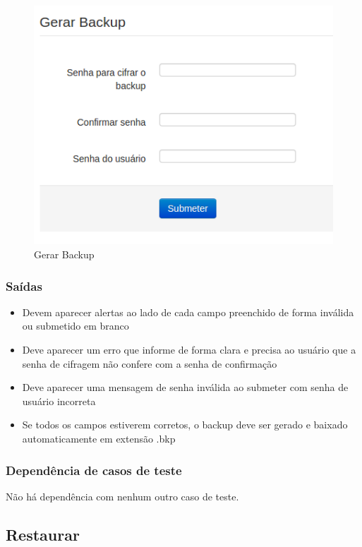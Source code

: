 \begin{figure}[ht]
     \centering
     \includegraphics[scale=0.6]{images/gerarbackup.png}
     \caption{Gerar Backup}
     \label{fig:gerarbackup}
\end{figure}

\subsubsection{Saídas}

\begin{itemize}

	\item Devem aparecer alertas ao lado de cada campo preenchido de forma inválida ou submetido em branco
	\item Deve aparecer um erro que informe de forma clara e precisa ao usuário que a senha de cifragem não confere com a senha de confirmação
	\item Deve aparecer uma mensagem de senha inválida ao submeter com senha de usuário incorreta
	\item Se todos os campos estiverem corretos, o backup deve ser gerado e baixado automaticamente em extensão .bkp
	
\end{itemize}

\subsubsection{Dependência de casos de teste}
Não há dependência com nenhum outro caso de teste.

\subsection{Restaurar}

